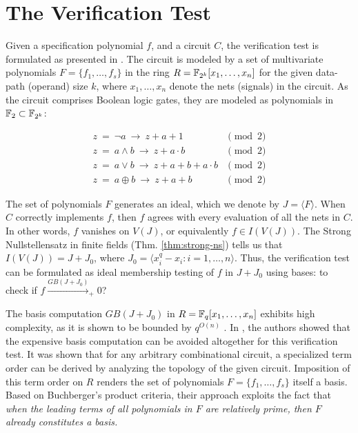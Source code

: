 \section{The Verification Test}
\label{sec:verify}

Given a specification polynomial $f$, and a circuit $C$, the
verification test is formulated as presented in
\cite{lv:tcad2013}. The circuit is modeled by a set of multivariate
polynomials $F=\{f_1,\dots,f_s\}$ in the ring $R={\mathbb{F}}_{2^k}[x_1,\dots,x_n]$
for the given data-path (operand) size $k$, where $x_1,\dots,x_n$
denote the nets (signals) in the circuit. As the circuit comprises
Boolean logic gates, they are modeled as polynomials in ${\mathbb{F}}_2 \subset
{\mathbb{F}}_{2^k}$:

\begin{equation}
\label{bool2poly}
\begin{split}
z ~ =  ~ \neg a ~ \rightarrow ~ z+a+1 & \pmod 2  \\
z ~ =  ~ a \wedge b ~ \rightarrow ~ z+a \cdot b & \pmod 2\\
z ~ =  ~ a \vee b ~ \rightarrow ~ z+a+b+a \cdot b & \pmod 2 \\
z ~ =  ~ a \oplus b ~ \rightarrow ~ z+a+b & \pmod 2 
\end{split}
\end{equation}

The set of polynomials $F$ generates an ideal, which we denote by $J =
\langle F\rangle$. When $C$ correctly implements $f$, then $f$ agrees
with every evaluation of all the nets in $C$. In other words, $f$
vanishes on $V(J)$, or equivalently $f \in I(V(J))$. The Strong
Nullstellensatz in finite fields (Thm. \ref{thm:strong-ns}) tells us
that $I(V(J)) = J + J_0$, where $J_0 = \langle x_i^q-x_i:
i=1,\dots,n\rangle$. Thus, the verification test can be formulated as
ideal membership testing of $f$ in $J+J_0$ using \Grobner bases: to
check if $f\xrightarrow{GB(J+J_0)}_+0$?

The \Grobner basis computation $GB(J+J_0)$ in $R={\mathbb{F}}_q[x_1,\dots,x_n]$ exhibits high
complexity, as it is shown to be bounded by
$q^{O(n)}$ \cite{gao:qe-gf-gb}. In \cite{lv:tcad2013}, the authors showed that the expensive \Grobner
basis computation can be avoided altogether for this verification
test. It was shown that for any arbitrary combinational circuit, a
specialized term order can be derived by analyzing the topology of the
given circuit. Imposition of this term order on $R$ renders the set of
polynomials $F=\{f_1,\dots,f_s\}$ itself a \Grobner basis. Based on
Buchberger's product criteria, their approach exploits the fact
that {\it when the leading terms of all polynomials in $F$ are
  relatively prime, then $F$ already constitutes a \Grobner basis.}

